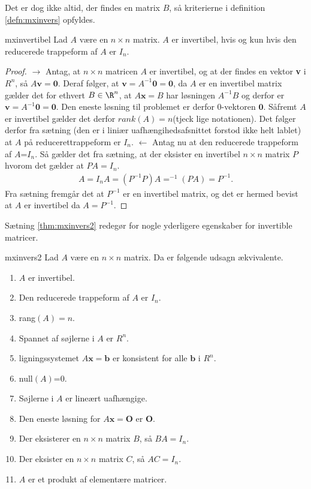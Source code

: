 %
%
Det er dog ikke altid, der findes en matrix $B$, så kriterierne i definition \ref{defn:mxinvers} opfyldes. 
%
\begin{thm}{}{mxinvertibel}
Lad $A$ være en $n \times n$ matrix. 
$A$ er invertibel, hvis og kun hvis den reducerede trappeform af $A$ er $I_n$.
\end{thm}
%
\begin{proof}
$\rightarrow$ Antag, at $n\times n$ matricen $A$ er invertibel, og at der findes en vektor \textbf{v} i $R^n$, så $A\textbf{v}=\textbf{0}$. 
Deraf følger, at $\textbf{v}=A^{-1}\textbf{0}=\textbf{0}$, da $A$ er en invertibel matrix gælder det for ethvert $B \in \R^n$, at $A\textbf{x}=B$ har løsningen $A^{-1}B$ og derfor er $\textbf{v}=A^{-1}\textbf{0}=\textbf{0}$. 
Den eneste løsning til problemet er derfor $0$-vektoren $\textbf{0}$. 
Såfremt $A$ er invertibel gælder det derfor $rank(A)=n$(tjeck lige notationen).
Det følger derfor fra sætning (den er i liniær uafhængihedsafsnittet forstod ikke helt lablet) at $A$ på reducerettrappeform er $I_n$.
$\leftarrow$
Antag nu at den reducerede trappeform af $A$=$I_n$. 
Så gælder det fra sætning, at der eksister en invertibel $n \times n$ matrix $P$ hvorom det gælder at $PA=I_n$. 
%
\begin{align*}
A=I_nA=(P^{-1}P)A=^{-1}(PA)=P^{-1}.
\end{align*}
%
Fra sætning fremgår det at $P^{-1}$ er en invertibel matrix, og det er hermed bevist at $A$ er invertibel da $A=P^{-1}$.
\end{proof}
Sætning \ref{thm:mxinvers2} redegør for nogle yderligere egenskaber for invertible matricer. 
%
\begin{thm}{}{mxinvers2}
Lad $A$ være en $n \times n$ matrix. 
Da er følgende udsagn ækvivalente.
\begin{enumerate}[label=(\alph*)]
\item $A$ er invertibel.
\item Den reducerede trappeform af $A$ er $I_n$.
\item rang$(A)=n$.
\item Spannet af søjlerne i $A$ er $R^n$.
\item ligningssystemet $A\textbf{x}=\textbf{b}$ er konsistent for alle $\textbf{b}$ i $R^n$.
\item null$(A)$=0.
\item Søjlerne i $A$ er lineært uafhængige.
\item Den eneste løsning for $A\textbf{x}=\textbf{O}$ er $\textbf{O}$.
\item Der eksisterer en $n \times n$ matrix $B$, så $BA=I_n$.
\item Der eksister en $n \times n$ matrix $C$, så $AC=I_n$.
\item $A$ er et produkt af elementære matricer.
\end{enumerate}
\end{thm}
